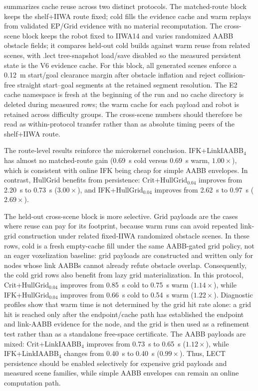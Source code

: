 \documentclass[journal]{IEEEtran}
\begin{document}
 summarizes cache reuse across two distinct
protocols. The matched-route block keeps the shelf+IIWA route fixed; cold fills
the evidence cache and warm replays from validated EP/Grid evidence with no
material recomputation. The cross-scene block keeps the robot fixed to IIWA14 and varies
randomized AABB obstacle fields; it compares held-out cold builds against
warm reuse from related scenes, with .lect tree-snapshot load/save disabled so
the measured persistent state is the V6 evidence cache. For this block, all
generated scenes enforce a 0.12~m start/goal clearance margin after obstacle
inflation and reject collision-free straight start--goal segments at the
retained segment resolution. The E2 cache namespace is fresh at the beginning of the run and no
cache directory is deleted during measured rows; the warm cache for each
payload and robot is retained across difficulty groups. The cross-scene numbers
should therefore be read as within-protocol transfer rather than as absolute
timing peers of the shelf+IIWA route.

The route-level results reinforce the microkernel conclusion. IFK+LinkIAABB$_4$
has almost no matched-route gain (0.69~s cold versus 0.69~s warm,
$1.00\times$), which is consistent with online IFK being cheap for simple AABB
envelopes. In contrast, HullGrid benefits from persistence:
Crit+HullGrid$_{0.04}$ improves from 2.20~s to 0.73~s ($3.00\times$), and
IFK+HullGrid$_{0.04}$ improves from 2.62~s to 0.97~s ($2.69\times$).

The held-out cross-scene block is more selective. Grid payloads are the cases
where reuse can pay for its footprint, because warm runs can avoid repeated
link-grid construction under related fixed-IIWA randomized obstacle scenes. In
these rows, cold is a fresh empty-cache fill under the same AABB-gated grid
policy, not an eager voxelization baseline: grid payloads are constructed and
written only for nodes whose link AABBs cannot already refute obstacle overlap.
Consequently, the cold grid rows also benefit from lazy grid materialization.
In this protocol, Crit+HullGrid$_{0.04}$ improves from 0.85~s cold to 0.75~s warm
($1.14\times$), while IFK+HullGrid$_{0.04}$ improves from 0.66~s cold to
0.54~s warm ($1.22\times$). Diagnostic profiles show that warm time is not
determined by the grid hit rate alone: a grid hit is reached only after the
endpoint/cache path has established the endpoint and link-AABB evidence for the
node, and the grid is then used as a refinement test rather than as a standalone
free-space certificate. The AABB payloads are mixed: Crit+LinkIAABB$_4$
improves from 0.73~s to 0.65~s ($1.12\times$), while IFK+LinkIAABB$_4$ changes
from 0.40~s to 0.40~s ($0.99\times$). Thus, LECT persistence should be enabled
selectively for expensive grid payloads and measured scene families, while
simple AABB envelopes can remain an online computation path.
\end{document}

